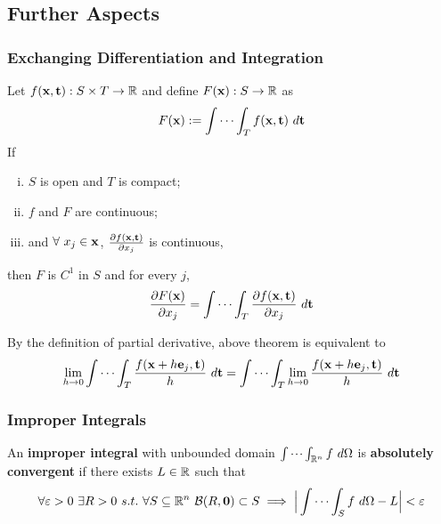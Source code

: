 \documentclass[11pt]{article}
\begin{document}
		\subsection{Further Aspects}
			\subsubsection{Exchanging Differentiation and Integration}
			
			\begin{theorem}
				Let $f(\textbf{x}, \textbf{t}): S \times T \to \mathbb{R}$ and define $F(\textbf{x}): S \to \mathbb{R}$ as 
				\begin{equation}
					F(\textbf{x}) := \int \cdots \int_T f(\textbf{x}, \textbf{t})\ d\textbf{t}
				\end{equation}
				If
				\begin{enumerate}[(i)]
					\item $S$ is open and $T$ is compact;
					\item $f$ and $F$ are continuous;
					\item and $\forall\ x_j \in \textbf{x}$, $\frac{\partial{f(\textbf{x}, \textbf{t})}}{\partial{x_j}}$ is continuous,
				\end{enumerate}
				then $F$ is $C^1$ in $S$ and for every $j$,
				\begin{equation}
					\frac{\partial{F(\textbf{x})}}{\partial{x_j}} = \idotsint_T \frac{\partial{f(\textbf{x}, \textbf{t})}}{\partial{x_j}}\ d\textbf{t}
				\end{equation}
			\end{theorem}
	
			\begin{corollary}
				By the definition of partial derivative, above theorem is equivalent to 
				\begin{equation}
					\lim_{h \to 0} \idotsint_T \frac{f(\textbf{x} + h \textbf{e}_j, \textbf{t})}{h}\ d\textbf{t} = \idotsint_T \lim_{h \to 0} \frac{f(\textbf{x} + h \textbf{e}_j, \textbf{t})}{h}\ d\textbf{t}
				\end{equation}
			\end{corollary}
			
			\subsubsection{Improper Integrals}
				\begin{definition}
					An \textbf{improper integral} with unbounded domain $\idotsint_{\mathbb{R}^n} f\ d\Omega$ is \textbf{absolutely convergent} if there exists $L \in \mathbb{R}$ such that
					\begin{equation}
						\forall \varepsilon > 0\ \exists R > 0\ s.t.\ \forall S \subseteq \R^n\ \mc{B}(R, \ve{0}) \subset S \implies \Big|\idotsint_S f\ d\Omega - L \Big| < \varepsilon
					\end{equation}
				\end{definition}
				
\end{document}
